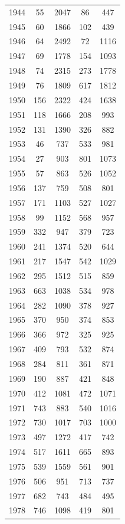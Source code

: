 \documentclass[12pt,]{article}
\begin{document}
\begin{center}
\begin{longtable}{ccccc}
  1944 & 55 & 2047 & 86 & 447 \\ 
  1945 & 60 & 1866 & 102 & 439 \\ 
  1946 & 64 & 2492 & 72 & 1116 \\ 
  1947 & 69 & 1778 & 154 & 1093 \\ 
  1948 & 74 & 2315 & 273 & 1778 \\ 
  1949 & 76 & 1809 & 617 & 1812 \\ 
  1950 & 156 & 2322 & 424 & 1638 \\ 
  1951 & 118 & 1666 & 208 & 993 \\ 
  1952 & 131 & 1390 & 326 & 882 \\ 
  1953 & 46 & 737 & 533 & 981 \\ 
  1954 & 27 & 903 & 801 & 1073 \\ 
  1955 & 57 & 863 & 526 & 1052 \\ 
  1956 & 137 & 759 & 508 & 801 \\ 
  1957 & 171 & 1103 & 527 & 1027 \\ 
  1958 & 99 & 1152 & 568 & 957 \\ 
  1959 & 332 & 947 & 379 & 723 \\ 
  1960 & 241 & 1374 & 520 & 644 \\ 
  1961 & 217 & 1547 & 542 & 1029 \\ 
  1962 & 295 & 1512 & 515 & 859 \\ 
  1963 & 663 & 1038 & 534 & 978 \\ 
  1964 & 282 & 1090 & 378 & 927 \\ 
  1965 & 370 & 950 & 374 & 853 \\ 
  1966 & 366 & 972 & 325 & 925 \\ 
  1967 & 409 & 793 & 532 & 874 \\ 
  1968 & 284 & 811 & 361 & 871 \\ 
  1969 & 190 & 887 & 421 & 848 \\ 
  1970 & 412 & 1081 & 472 & 1071 \\ 
  1971 & 743 & 883 & 540 & 1016 \\ 
  1972 & 730 & 1017 & 703 & 1000 \\ 
  1973 & 497 & 1272 & 417 & 742 \\ 
  1974 & 517 & 1611 & 665 & 893 \\ 
  1975 & 539 & 1559 & 561 & 901 \\ 
  1976 & 506 & 951 & 713 & 737 \\ 
  1977 & 682 & 743 & 484 & 495 \\ 
  1978 & 746 & 1098 & 419 & 801 \\ 

\end{longtable}
\end{center}
\end{document}
